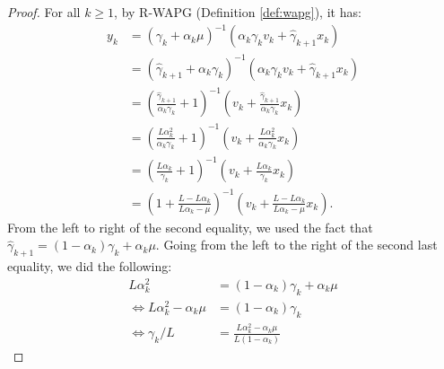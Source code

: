 \documentclass[12pt]{article}
\begin{document}
        \begin{proof}
            For all $k \ge 1$, by R-WAPG (Definition \ref{def:wapg}), it has: 
            \begin{align*}
                y_{k} &= 
                (\gamma_k + \alpha_k \mu)^{-1}
                (\alpha_k \gamma_k v_k + \hat \gamma_{k + 1}x_k)
                \\
                &= 
                (\hat \gamma_{k + 1} + \alpha_k \gamma_k)^{-1}
                (\alpha_k \gamma_k v_k + \hat \gamma_{k + 1}x_k)
                \\
                &= 
                \left(
                    \frac{\hat \gamma_{k + 1}}{\alpha_k\gamma_k} + 1
                \right)^{-1}
                \left(
                    v_k + \frac{\hat \gamma_{k + 1}}{\alpha_k \gamma_k} x_k
                \right)
                \\
                &= 
                \left(
                    \frac{L\alpha_k^2}{\alpha_k\gamma_k} + 1
                \right)^{-1}
                \left(
                    v_k + \frac{L\alpha_k^2}{\alpha_k \gamma_k} x_k
                \right)
                \\
                &= 
                \left(
                    \frac{L\alpha_k}{\gamma_k} + 1
                \right)^{-1}
                \left(
                    v_k + \frac{L\alpha_k}{ \gamma_k} x_k
                \right)
                \\
                &= 
                \left(
                    1 + \frac{L - L \alpha_k}{L \alpha_k - \mu}
                \right)^{-1}
                \left(
                    v_k + 
                    \frac{L - L \alpha_k}{L \alpha_k - \mu} x_k
                \right). 
            \end{align*}
            From the left to right of the second equality, we used the fact that $\hat \gamma_{k + 1} = (1 - \alpha_k)\gamma_k + \alpha_k\mu$. 
            Going from the left to the right of the second last equality, we did the following: 
            \begin{align*}
                L\alpha_k^2 &= 
                (1 - \alpha_k)\gamma_k + \alpha_k \mu 
                \\
                \iff 
                L \alpha_k^2 - \alpha_k\mu &= 
                (1 - \alpha_k)\gamma_k
                \\
                \iff 
                \gamma_k/L
                &= 
                \frac{L \alpha_k^2 - \alpha_k\mu}{L (1 - \alpha_k)}

\end{align*}
\end{proof}
\end{document}
